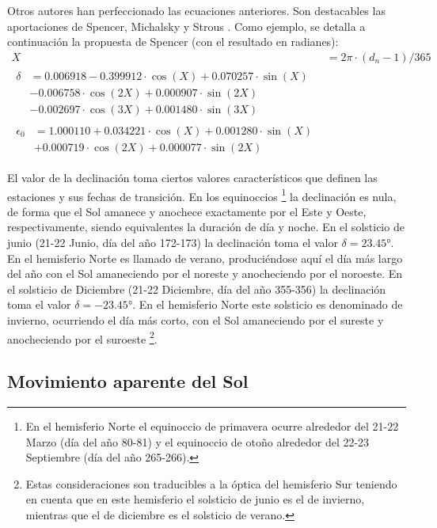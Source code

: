 Otros autores han perfeccionado las ecuaciones anteriores. Son
destacables las aportaciones de Spencer, Michalsky y Strous \cite{Spencer1971, Michalsky1988,
  Strous2011}. Como ejemplo, se detalla a continuación la propuesta de
Spencer (con el resultado en radianes):
\begin{align}
  \label{eq:spencer}
  X &= 2 \pi \cdot (d_n-1)/365\\
  \begin{split}
    \delta &= 0.006918 - 0.399912 \cdot \cos(X) + 0.070257 \cdot \sin(X)\\
    &-  0.006758 \cdot \cos(2 X) + 0.000907 \cdot \sin(2 X)\\
    &- 0.002697 \cdot \cos(3 X) + 0.001480 \cdot \sin(3  X)
  \end{split}\\
  \begin{split}
    \epsilon_{0} &= 1.000110 + 0.034221 \cdot \cos(X) + 0.001280 \cdot
    \sin(X)\\
    &+ 0.000719 \cdot \cos(2 X) + 0.000077 \cdot \sin(2 X)
  \end{split}
\end{align}

El valor de la declinación toma ciertos valores característicos que
definen las estaciones y sus fechas de transición. En los equinoccios%
\footnote{ En el hemisferio Norte el equinoccio de primavera ocurre alrededor
del 21-22 Marzo (día del año 80-81) y el equinoccio de otoño alrededor
del 22-23 Septiembre (día del año 265-266).}%
la declinación es nula, de forma que el Sol amanece y anochece exactamente
por el Este y Oeste, respectivamente, siendo equivalentes la duración
de día y noche. En el solsticio de junio (21-22 Junio, día del año
172-173) la declinación toma el valor $\delta=\ang{23.45}$. En el
hemisferio Norte es llamado de verano, produciéndose aquí el día más
largo del año con el Sol amaneciendo por el noreste y anocheciendo
por el noroeste. En el solsticio de Diciembre (21-22 Diciembre, día
del año 355-356) la declinación toma el valor $\delta=\ang{-23.45}$.
En el hemisferio Norte este solsticio es denominado de invierno, ocurriendo
el día más corto, con el Sol amaneciendo por el sureste y anocheciendo
por el suroeste%
\footnote{Estas consideraciones son traducibles a la óptica del hemisferio Sur
teniendo en cuenta que en este hemisferio el solsticio de junio es
el de invierno, mientras que el de diciembre es el solsticio de verano.%
}. 


\subsection{Movimiento aparente del Sol}

